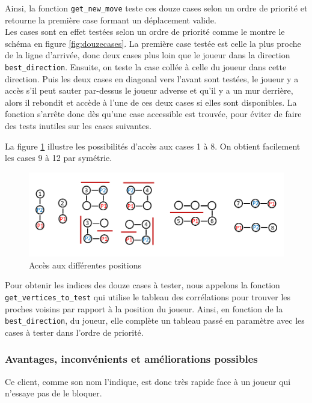 \documentclass[11pt]{article}
\begin{document}
Ainsi, la fonction \texttt{get\_new\_move} teste ces douze cases selon un ordre de priorité et retourne la première case formant un déplacement valide. \\
Les cases sont en effet testées selon un ordre de priorité comme le montre le schéma en figure \ref{fig:douzecases}.
La première case testée est celle la plus proche de la ligne d'arrivée, donc deux cases plus loin que le joueur dans la direction \texttt{best\_direction}. Ensuite, on teste la case collée à celle du joueur dans cette direction. Puis les deux cases en diagonal vers l'avant sont testées, le joueur y a accès s'il peut sauter par-dessus le joueur adverse et qu'il y a un mur derrière, alors il rebondit et accède à l'une de ces deux cases si elles sont disponibles. La fonction s'arrête donc dès qu'une case accessible est trouvée, pour éviter de faire des tests inutiles sur les cases suivantes.

La figure \ref{fig:acces} illustre les possibilités d'accès aux cases 1 à 8. On obtient facilement les cases 9 à 12 par symétrie.

\begin{figure}[H]
    \centering
    \includegraphics[scale = 0.4]{acces.png}
    \caption{Accès aux différentes positions}
    \label{fig:acces}
\end{figure}

Pour obtenir les indices des douze cases à tester, nous appelons la fonction \texttt{get\_vertices\_to\_test} qui utilise le tableau des corrélations pour trouver les proches voisins par rapport à la position du joueur. Ainsi, en fonction de la \texttt{best\_direction}, du joueur, elle complète un tableau passé en paramètre avec les cases à tester dans l'ordre de priorité. \\

\subsubsection{Avantages, inconvénients et améliorations possibles}

Ce client, comme son nom l'indique, est donc très rapide face à un joueur qui n'essaye pas de le bloquer. \\
\end{document}
